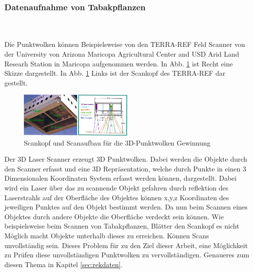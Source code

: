 \documentclass{llncs}
\begin{document}
\subsubsection{Datenaufnahme von Tabakpflanzen}
~\\\\
Die Punktwolken können Beispielsweise von den TERRA-REF Feld Scanner von der University von Arizona Maricopa Agricultural Center and USD Arid Land Researh Station in Maricopa aufgenommen werden. In Abb. \ref{fig:Bild9} ist  Recht eine Skizze dargestellt. In Abb. \ref{fig:Bild9} Links ist der Scankopf des TERRA-REF dar gestellt. 
 

\begin{figure}[htbp] 
	\centering
	\includegraphics[width=0.5\textwidth]{lematech_2.png}
	\caption{Scankopf und Scanaufbau für die 3D-Punktwolken Gewinnung}
	\label{fig:Bild9}
\end{figure}

Der 3D Laser Scanner erzeugt 3D Punktwolken. Dabei werden die Objekte durch den Scanner erfasst und eine 3D Repräsentation, welche durch Punkte in einen 3 Dimensionalen Koordinaten System erfasst werden können, dargestellt. Dabei wird ein Laser über das zu scannende Objekt gefahren durch reflektion des Laserstrahls auf der Oberfläche des Objektes können x,y,z Koordinaten des jeweiligen Punktes auf den Objekt bestimmt werden. Da nun beim Scannen eines Objektes durch andere Objekte die Oberfläche verdeckt sein können. Wie beispielsweise beim Scannen von Tabakpflanzen, Blätter den Scankopf es nicht Möglich macht Objekte unterhalb dieses zu erreichen. Können Scans unvollständig sein. Dieses Problem für zu den Ziel dieser Arbeit, eine Möglichkeit zu Prüfen diese unvollständigen Punktwolken zu vervollständigen. Genaueres zum diesen Thema in Kapitel \ref{sec:rekdaten}. 

\newpage
\end{document}
